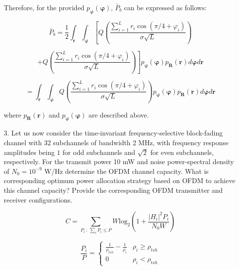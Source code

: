 \documentclass[fleqn]{article}
\begin{document}
\begin{enumerate}
		Therefore, for the provided $p_{\boldsymbol{\varphi}}(\boldsymbol{\varphi})$, $\bar{P}_b$ can be expressed as follows:
		
		\begin{equation*}
			\bar{P}_b = \frac{1}{2}\int_{\mathbf{r}}{\int_{\boldsymbol{\varphi}}{\left[Q\left(\frac{\sum_{i=1}^{L}{r_i\cos(\pi/4 + \varphi_i)}}{\sigma\sqrt{L}}\right)\right.}}
		\end{equation*}
		
		\begin{equation*}
			{{\left. + Q\left(\frac{\sum_{i=1}^{L}{r_i\cos(\pi/4 + \varphi_i)}}{\sigma\sqrt{L}}\right)\right]p_{\boldsymbol{\varphi}}(\boldsymbol{\varphi})p_{\mathbf{R}}(\mathbf{r})d\boldsymbol{\varphi}}d\mathbf{r}}
		\end{equation*}
		
		\begin{equation*}
			= \int_{\mathbf{r}}{\int_{\boldsymbol{\varphi}}{Q\left(\frac{\sum_{i=1}^{L}{r_i\cos(\pi/4 + \varphi_i)}}{\sigma\sqrt{L}}\right)p_{\boldsymbol{\varphi}}(\boldsymbol{\varphi})p_{\mathbf{R}}(\mathbf{r})d\boldsymbol{\varphi}}d\mathbf{r}}
		\end{equation*}
		
		where $p_\mathbf{R}(\mathbf{r})$ and $p_{\boldsymbol{\varphi}}(\boldsymbol{\varphi})$ are described above.
		 
		\item[3.] Let us now consider the time-invariant frequency-selective block-fading channel with 32 subchannels of bandwidth 2 MHz, with frequency response amplitudes being $1$ for odd subchannels and $\sqrt{2}$ for even subchannels, respectively. For the transmit power 10 mW and noise power-spectral density of $N_0=10^{-9}$ W/Hz determine the OFDM channel capacity. What is corresponding optimum power allocation strategy based on OFDM to achieve this channel capacity? Provide the corresponding OFDM transmitter and receiver configurations.
		
		\begin{equation*}
			C = \underset{P_i \ :\ \sum_i{P_i \leq P}}{\sum}{W\text{log}_2\left(1 + \frac{|H_i|^2P_i}{N_0W}\right)}
		\end{equation*}
		
		\begin{equation*}
			\frac{P_i}{P} = \begin{cases}
				\frac{1}{\rho_{tsh}} - \frac{1}{\rho_i} & \rho_i \geq \rho_{tsh} \\
				0 & \rho_i < \rho_{tsh}
			\end{cases}
		\end{equation*}
		

\end{enumerate}
\end{document}
